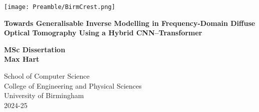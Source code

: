 
\thispagestyle{empty}

\begin{spacing}{2}
	\begin{center}
		\texttt{[image: Preamble/BirmCrest.png]}
	\end{center}
	\vspace{10mm}
	\begin{center}
		\textbf{\Large Towards Generalisable Inverse Modelling in Frequency-Domain Diffuse Optical Tomography Using a Hybrid CNN–Transformer}
		\vspace{10mm}
	\end{center}
	\begin{center}
		\textbf{\large MSc Dissertation}
		\vspace{20mm}
		\\\textbf{\Large Max Hart}
		\vspace{30mm}
	\end{center}
	\begin{center}
		{\large School of Computer Science}
		\\ {\large College of Engineering and Physical Sciences}
		\\ {\large University of Birmingham}
		\\ {\large 2024-25}
	\end{center}
\end{spacing}


